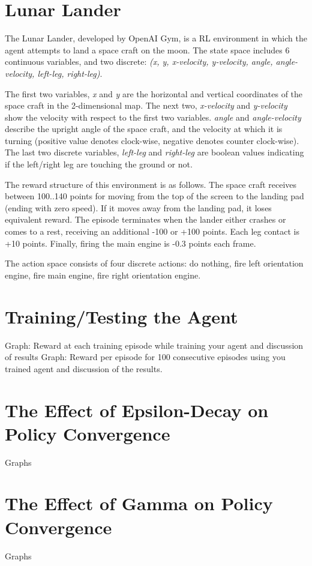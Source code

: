 \documentclass[conference]{IEEEtran}
\begin{document}
\section{Lunar Lander}
The Lunar Lander, developed by OpenAI Gym, is a RL environment in which the agent attempts to land a space craft on the moon. The state space includes 6 continuous variables, and two discrete: \textit{(x, y, x-velocity, y-velocity, angle, angle-velocity, left-leg, right-leg)}.

The first two variables, \textit{x} and \textit{y} are the horizontal and vertical coordinates of the space craft in the 2-dimensional map. The next two, \textit{x-velocity} and \textit{y-velocity} show the velocity with respect to the first two variables. \textit{angle} and \textit{angle-velocity} describe the upright angle of the space craft, and the velocity at which it is turning (positive value denotes clock-wise, negative denotes counter clock-wise). The last two discrete variables, \textit{left-leg} and \textit{right-leg} are boolean values indicating if the left/right leg are touching the ground or not.

The reward structure of this environment is as follows. The space craft receives between 100..140 points for moving from the top of the screen to the landing pad (ending with zero speed). If it moves away from the landing pad, it loses equivalent reward. The episode terminates when the lander either crashes or comes to a rest, receiving an additional -100 or +100 points. Each leg contact is +10 points. Finally, firing the main engine is -0.3 points each frame.

The action space consists of four discrete actions: do nothing, fire left orientation engine, fire main engine, fire right orientation engine.

\section{Training/Testing the Agent}
Graph: Reward at each training episode while training your agent and discussion of results
Graph: Reward per episode for 100 consecutive episodes using you trained agent and discussion of the results.

\section{The Effect of Epsilon-Decay on Policy Convergence}
Graphs

\section{The Effect of Gamma on Policy Convergence}
Graphs
\end{document}
